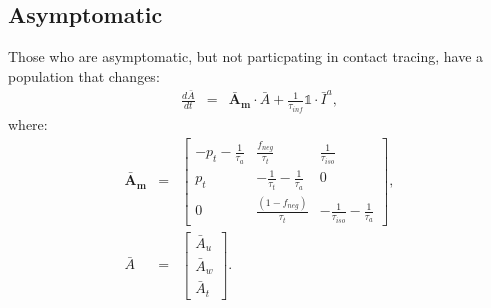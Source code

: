 \documentclass[notitlepage, superscriptaddress]{revtex4-2}
\begin{document}
\subsection{Asymptomatic}
Those who are asymptomatic, but not particpating in contact tracing, have a population that changes:
\begin{eqnarray}
\frac{d\bar{A}}{dt} &=& \boldsymbol{\bar{A}_{m}} \cdot  \bar{A} + \frac{1}{\tau_{inf}} \mathbb{1} \cdot  \bar{I}^{a}, 
\end{eqnarray}
where:
%
\begin{eqnarray}
\boldsymbol{\bar{A}_{m}} &=&
\begin{bmatrix}
- p_{t} -\frac{1}{\tau_{a}}  &  \frac{f_{neg}}{\tau_{t}}            & \frac{1}{\tau_{iso}} \\ 
 p_{t}              & -\frac{1}{\tau_{t}} -\frac{1}{\tau_{a}}       & 0  \\ 
 0                  & \frac{(1- f_{neg})}{\tau_{t}}                        & -\frac{1}{\tau_{iso}} -\frac{1}{\tau_{a}}
\end{bmatrix}, \\ 
%
\bar{A} &=& 
\begin{bmatrix}
\bar{A}_{u} \\ \bar{A}_{w}\\ \bar{A}_{t}
\end{bmatrix}. \\ 
%
\end{eqnarray}
\end{document}
